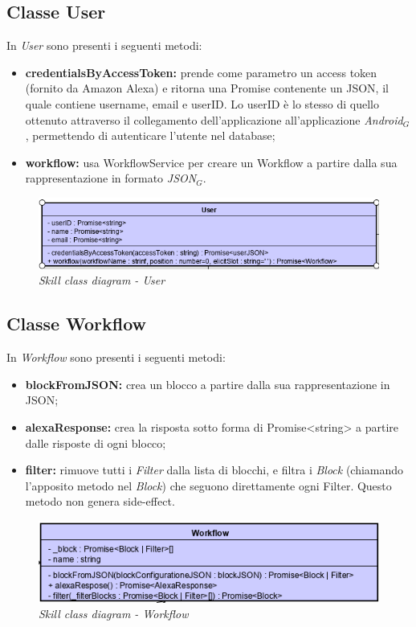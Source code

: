 \subsection{Classe User}
In \textit{User} sono presenti i seguenti metodi:
\begin{itemize}
    \item \textbf{credentialsByAccessToken:} prende come parametro un access token (fornito da Amazon Alexa) e ritorna una Promise contenente un JSON, il quale contiene username, email e userID. Lo userID è lo stesso di quello ottenuto attraverso il collegamento dell'applicazione all'applicazione \textit{Android$_{G}$}, permettendo di autenticare l'utente nel database;
    \item \textbf{workflow:} usa WorkflowService per creare un Workflow a partire dalla sua rappresentazione in formato \textit{JSON$_{G}$}.
\end{itemize}
\begin{figure} [H]
    \centering
	\includegraphics[scale=0.8]{./images/user.PNG}
	\caption{\textit{Skill class diagram - User}}\label{classlambda}
\end{figure}
\subsection{Classe Workflow}
In \textit{Workflow} sono presenti i seguenti metodi:
\begin{itemize}
    \item \textbf{blockFromJSON:} crea un blocco a partire dalla sua rappresentazione in JSON;
    \item \textbf{alexaResponse:} crea la risposta sotto forma di Promise<string> a partire dalle risposte di ogni blocco;
    \item \textbf{filter:} rimuove tutti i \textit{Filter} dalla lista di blocchi, e filtra i \textit{Block} (chiamando l'apposito metodo nel \textit{Block}) che seguono direttamente ogni Filter. Questo metodo non genera side-effect.
\end{itemize}
\begin{figure} [H]
    \centering
	\includegraphics[scale=0.8]{./images/workflow.PNG}
	\caption{\textit{Skill class diagram - Workflow}}\label{classlambda}
\end{figure}
